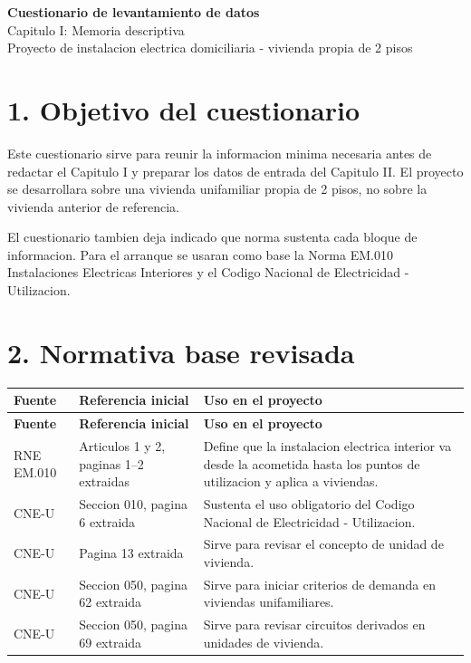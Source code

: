 \documentclass[12pt,a4paper]{article}
\begin{document}
\begin{center}
{\Large \textbf{Cuestionario de levantamiento de datos}}\\
{\large Capitulo I: Memoria descriptiva}\\
{\normalsize Proyecto de instalacion electrica domiciliaria - vivienda propia de 2 pisos}
\end{center}

\section*{1. Objetivo del cuestionario}

Este cuestionario sirve para reunir la informacion minima necesaria antes de redactar el Capitulo I y preparar los datos de entrada del Capitulo II. El proyecto se desarrollara sobre una vivienda unifamiliar propia de 2 pisos, no sobre la vivienda anterior de referencia.

El cuestionario tambien deja indicado que norma sustenta cada bloque de informacion. Para el arranque se usaran como base la Norma EM.010 Instalaciones Electricas Interiores y el Codigo Nacional de Electricidad - Utilizacion.

\section*{2. Normativa base revisada}

\begin{longtable}{L{3.2cm}L{4.6cm}L{5.8cm}}
\toprule
\textbf{Fuente} & \textbf{Referencia inicial} & \textbf{Uso en el proyecto} \\
\midrule
\endfirsthead
\toprule
\textbf{Fuente} & \textbf{Referencia inicial} & \textbf{Uso en el proyecto} \\
\midrule
\endhead
RNE EM.010 & Articulos 1 y 2, paginas 1--2 extraidas & Define que la instalacion electrica interior va desde la acometida hasta los puntos de utilizacion y aplica a viviendas. \\
CNE-U & Seccion 010, pagina 6 extraida & Sustenta el uso obligatorio del Codigo Nacional de Electricidad - Utilizacion. \\
CNE-U & Pagina 13 extraida & Sirve para revisar el concepto de unidad de vivienda. \\
CNE-U & Seccion 050, pagina 62 extraida & Sirve para iniciar criterios de demanda en viviendas unifamiliares. \\
CNE-U & Seccion 050, pagina 69 extraida & Sirve para revisar circuitos derivados en unidades de vivienda. \\
\bottomrule
\end{longtable}
\end{document}
